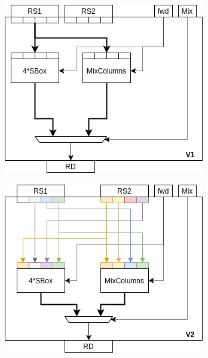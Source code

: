 \begin{figure}
\centering
\begin{subfigure}[t]{0.40\textwidth}
    \centering
    \includegraphics[width=\textwidth]{diagrams/ise-datapath-v1.png}
    \caption{}
    \label{fig:design:fu_block:v1}
\end{subfigure}
\begin{subfigure}[t]{0.40\textwidth}
    \centering
    \includegraphics[width=\textwidth]{diagrams/ise-datapath-v2.png}
    \caption{}
    \label{fig:design:fu_block:v2}
\end{subfigure}


\end{figure}
